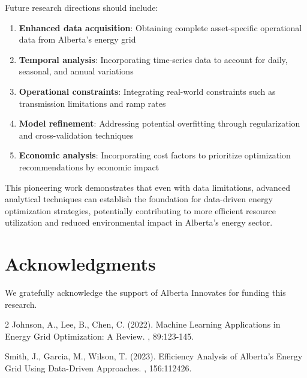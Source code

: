 \documentclass[12pt,a4paper]{article}
\begin{document}
Future research directions should include:
\begin{enumerate}
    \item \textbf{Enhanced data acquisition}: Obtaining complete asset-specific operational data from Alberta's energy grid
    \item \textbf{Temporal analysis}: Incorporating time-series data to account for daily, seasonal, and annual variations
    \item \textbf{Operational constraints}: Integrating real-world constraints such as transmission limitations and ramp rates
    \item \textbf{Model refinement}: Addressing potential overfitting through regularization and cross-validation techniques
    \item \textbf{Economic analysis}: Incorporating cost factors to prioritize optimization recommendations by economic impact
\end{enumerate}

This pioneering work demonstrates that even with data limitations, advanced analytical techniques can establish the foundation for data-driven energy optimization strategies, potentially contributing to more efficient resource utilization and reduced environmental impact in Alberta's energy sector.

\section*{Acknowledgments}
We gratefully acknowledge the support of Alberta Innovates for funding this research.


\begin{thebibliography}{2}
Johnson, A., Lee, B., Chen, C. (2022).
\newblock Machine Learning Applications in Energy Grid Optimization: A Review.
, 89:123-145.

Smith, J., Garcia, M., Wilson, T. (2023).
\newblock Efficiency Analysis of Alberta's Energy Grid Using Data-Driven Approaches.
, 156:112426.
\end{thebibliography}
\end{document}
